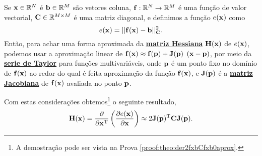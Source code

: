 \begin{theorem}\label{theo:der2fxbCfxb0aprox}
Se 
$\VECTOR{x}\in \mathbb{R}^N$ é  
$\VECTOR{b}\in \mathbb{R}^M$ são vetores coluna,  
$\VECTOR{f}: \mathbb{R}^{N}\rightarrow \mathbb{R}^{M}$ é uma função de valor vectorial,
$\MATRIX{C} \in \mathbb{R}^{M\times M}$ é uma matriz diagonal, e 
definimos a função $e(\VECTOR{x})$ como
\begin{equation}
e(\VECTOR{x})= ||\VECTOR{f}(\VECTOR{x})-\VECTOR{b}||_{\MATRIX{C}}^2.
\end{equation}
Então, para achar uma forma aproximada da \hyperref[def:hessian]{\textbf{matriz Hessiana}} $\MATRIX{H}(\VECTOR{x})$ de $e(\VECTOR{x})$, 
podemos usar a aproximação linear de 
$\VECTOR{f}(\VECTOR{x})\approx \VECTOR{f}(\VECTOR{p}) + \MATRIX{J}(\VECTOR{p})$ $\left(\VECTOR{x}-\VECTOR{p}\right)$, 
por meio da \hyperref[def:taylor]{\textbf{serie de Taylor}} 
para funções multivariáveis,
onde $\VECTOR{p}$ é um ponto fixo no domínio de $\VECTOR{f}(\VECTOR{x})$ ao redor do qual é feita  aproximação
da função $\VECTOR{f}(\VECTOR{x})$,
e $\MATRIX{J}(\VECTOR{p})$ é a \hyperref[def:jacobian]{\textbf{matriz Jacobiana}} de $\VECTOR{f}(\VECTOR{x})$ avaliada no ponto $\VECTOR{p}$.

Com estas considerações obtemos\footnote{A demostração pode ser vista na Prova \ref{proof:theo:der2fxbCfxb0aprox}.} o seguinte resultado,
\begin{equation}
\MATRIX{H}(\VECTOR{x}) = \frac{\partial}{\partial \VECTOR{x}^{\transpose}}\left(  
\frac{\partial e(\VECTOR{x}) }{\partial \VECTOR{x}} \right) \approx 
2 \MATRIX{J}(\VECTOR{p})^{\transpose}\MATRIX{C} \MATRIX{J}(\VECTOR{p}).
\end{equation}


\end{theorem}
